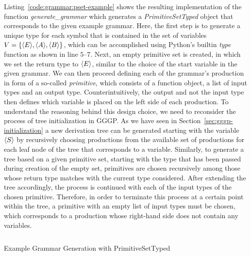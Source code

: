 Listing~\ref{code:grammar:pset-example} shows the resulting implementation of the function \emph{generate\_grammar} which generates a \emph{PrimitiveSetTyped} object that corresponds to the given example grammar.
Here, the first step is to generate a unique type for each symbol that is contained in the set of variables $V = \left\{\langle E \rangle, \langle A \rangle, \langle B \rangle \right\}$, which can be accomplished using Python's builtin \emph{type} function as shown in line $5$--$7$.
Next, an empty primitive set is created, in which we set the return type to $\langle E \rangle$, similar to the choice of the start variable in the given grammar.
We can then proceed defining each of the grammar's production in form of a so-called \emph{primitive}, which consists of a function object, a list of input types and an output type.
Counterintuitively, the output and not the input type then defines which variable is placed on the left side of each production.
To understand the reasoning behind this design choice, we need to reconsider the process of tree initialization in GGGP.
As we have seen in Section~\ref{sec:gggp-initialization} a new derivation tree can be generated starting with the variable $\langle S \rangle$ by recursively choosing productions from the available set of productions for each leaf node of the tree that corresponds to a variable.
Similarly, to generate a tree based on a given primitive set, starting with the type that has been passed during creation of the empty set, primitives are chosen recursively among those whose return type matches with the current type considered.
After extending the tree accordingly, the process is continued with each of the input types of the chosen primitive.
Therefore, in order to terminate this process at a certain point within the tree, a primitive with an empty list of input types must be chosen, which corresponds to a production whose right-hand side does not contain any variables.

\begin{listing}
	\inputminted[linenos]{python}{evostencils/grammar/pset_example.py}
	\caption{Example Grammar Generation with PrimitiveSetTyped}
	\label{code:grammar:pset-example}
\end{listing}


